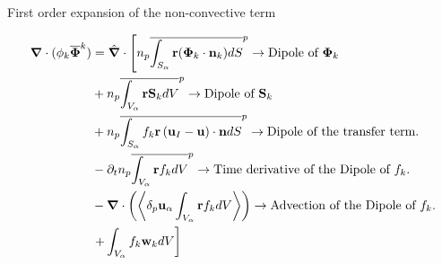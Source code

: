 \documentclass{sintefbeamer}
\newcommand{\nablab}{\bm{\nabla}}
\newcommand{\nablabh}{\hat{\bm{\nabla}}}
\begin{document}
\begin{frame}
  {First order expansion of the non-convective term}

  \begin{align*}
    \nablab \cdot
    (\phi_k \kavg{\bm{\Phi}})
    & = \nablabh
    \cdot
    \left[
    \pnavg{\int_{S_\alpha}
    \textbf{r}
    (\bm{\Phi}_k \cdot \textbf{n}_k) dS}  \rightarrow \text{Dipole of $\mathbf{\Phi}_k$}
    \right. \\
      &+\pnavg{\int_{V_\alpha}
      \textbf{r}
      \textbf{S}_k dV} \rightarrow \text{Dipole of $\textbf{S}_k$}\\
      &
      + \pnavg{\int_{S_\alpha} 
      f_k\textbf{r}
      \left(\textbf{u}_I - \textbf{u}\right) \cdot \textbf{n}dS}
      \rightarrow \text{Dipole of the transfer term.}\\
      &- \pddt
      \pnavg{\int_{V_\alpha}
      \textbf{r}  f_k dV }\rightarrow \text{Time derivative of the Dipole of $f_k$.}\\
      &- \nablab \cdot\left(
        \pavg{\textbf{u}_\alpha 
        \int_{V_\alpha}
        \textbf{r}  f_k dV}
      \right)\rightarrow \text{Advection of the Dipole of $f_k$.}\\
      & \left. +\int_{V_\alpha}
      f_k
      \textbf{w}_k
      dV\right]\\
  \end{align*}
\end{frame}
\end{document}
